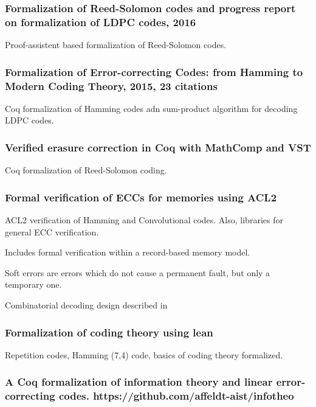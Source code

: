 \documentclass{article}
\begin{document}
\subsubsection{Formalization of Reed-Solomon codes and progress report on formalization of LDPC codes, 2016}

Proof-assistent based formalization of Reed-Solomon codes.

\subsubsection{Formalization of Error-correcting Codes: from Hamming to Modern Coding Theory, 2015, 23 citations}

Coq formalization of Hamming codes adn sum-product algorithm for decoding LDPC codes.

\subsubsection{Verified erasure correction in Coq with MathComp and VST}

Coq formalization of Reed-Solomon coding.

\subsubsection{Formal verification of ECCs for memories using ACL2}

ACL2 verification of Hamming and Convolutional codes. Also, libraries for general ECC verification.

Includes formal verification within a record-based memory model.

Soft errors are errors which do not cause a permanent fault, but only a temporary one.

Combinatorial decoding design described in 

\subsubsection{Formalization of coding theory using lean}

Repetition codes, Hamming (7,4) code, basics of coding theory formalized.

\subsubsection{A Coq formalization of information theory and linear error-correcting codes. https://github.com/affeldt-aist/infotheo}
\end{document}
